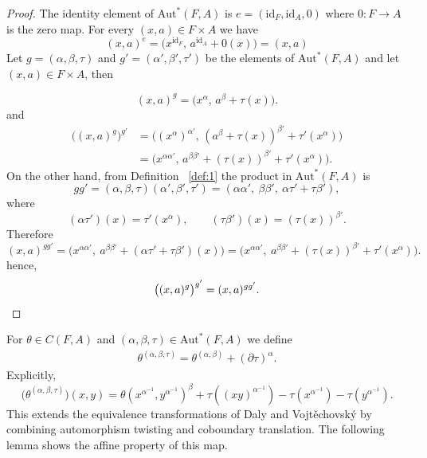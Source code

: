 \documentclass[12pt,a4paper]{amsart}
\theoremstyle{definition}
\begin{document}
\begin{proof}
The identity element of $\mathrm{Aut}^{\!*}(F,A)$ is $ e=(\mathrm{id}_F,\mathrm{id}_A,0)$
where $0:F\to A$ is the zero map. For every $(x,a)\in F\times A$ we have
\[
(x,a)^e
=
\bigl(x^{\mathrm{id}_F},\,a^{\mathrm{id}_A}+0(x)\bigr)
=
(x,a)
\]
Let $g=(\alpha, \beta, \tau)$ and $g'=(\alpha', \beta', \tau')$ be the elements of $\mathrm{Aut}^{\!*}(F,A)$ and let $(x,a)\in F\times A$, then 

\[(x,a)^g
=\bigl(x^{\alpha},\,a^{\beta}+\tau(x)\bigr).
\]
and 
\begin{align*}
\bigl((x,a)^g\bigr)^{g'}
&=
\bigl((x^{\alpha})^{\alpha'},\, (a^{\beta}+\tau(x))^{\beta'}+\tau'(x^{\alpha})\bigr) \\
&=
\bigl(x^{\alpha\alpha'},\, a^{\beta\beta'}+(\tau(x))^{\beta'}+\tau'(x^{\alpha})\bigr).
\end{align*}
On the other hand, from Definition ~\ref{def:1} the product in $\mathrm{Aut}^{\!*}(F,A)$ is
\[
gg'
=
(\alpha,\beta,\tau)(\alpha',\beta',\tau')
=
(\alpha\alpha',\ \beta\beta',\ \alpha\tau'+\tau\beta'),
\]
where
\[
(\alpha\tau')(x)=\tau'(x^{\alpha}),
\qquad
(\tau\beta')(x)=(\tau(x))^{\beta'}.
\]
Therefore
\[
(x,a)^{gg'}
=\bigl(x^{\alpha\alpha'},\ a^{\beta\beta'}+(\alpha\tau'+\tau\beta')(x)\bigr)
=
\bigl(x^{\alpha\alpha'},\ a^{\beta\beta'}+(\tau(x))^{\beta'}+\tau'(x^{\alpha})\bigr).
\]
hence, 
\[
\bigl((x,a)^g\bigr)^{g'}=(x,a)^{gg'}. \qedhere
\]
\end{proof}


For $\theta \in C(F,A)$ and $(\alpha,\beta,\tau) \in \mathrm{Aut}^{\!*}(F,A)$ we define 
\begin{align} \label{eq:Astar-action}
\theta^{(\alpha,\beta,\tau)}
=
\theta^{(\alpha,\beta)} + (\partial{\tau})^{\alpha}.
\end{align}
Explicitly,
\[
\bigl(\theta^{(\alpha,\beta,\tau)}\bigr)(x,y)
=
\theta(x^{\alpha^{-1}},y^{\alpha^{-1}})^{\beta}
+
\tau((xy)^{\alpha^{-1}})
-\tau(x^{\alpha^{-1}})
-\tau(y^{\alpha^{-1}}).
\]
This extends the equivalence transformations of Daly and Vojt\v{e}chovsk\'y by combining automorphism twisting and coboundary translation. The following lemma shows the affine property of this map.
\end{document}
